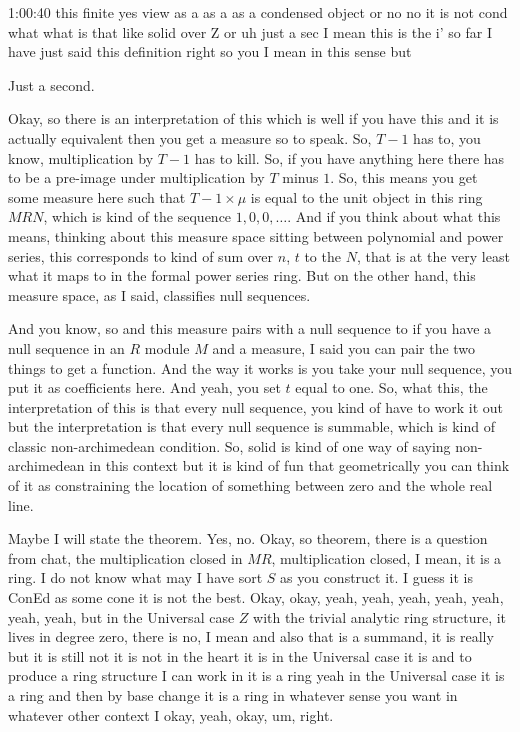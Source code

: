 \begin{unfinished}{1:00:40}
 this finite yes view as a as a as a condensed object or no no it is not cond what what is that like solid over Z or uh just a sec I mean this is the i' so far I have just said this definition right so you I mean in this sense but

Just a second.

Okay, so there is an interpretation of this which is well if you have this and it is actually equivalent then you get a measure so to speak. So, $T - 1$ has to, you know, multiplication by $T - 1$ has to kill. So, if you have anything here there has to be a pre-image under multiplication by $T$ minus $1$. So, this means you get some measure here such that $T - 1 \times \mu$ is equal to the unit object in this ring $MRN$, which is kind of the sequence $1, 0, 0, \ldots$. And if you think about what this means, thinking about this measure space sitting between polynomial and power series, this corresponds to kind of sum over $n$, $t$ to the $N$, that is  at the very least what it maps to in the formal power series ring. But on the other hand, this measure space, as I said, classifies null sequences.

And you know, so and this measure pairs with a null sequence to if you have a null sequence in an $R$ module $M$ and a measure, I said you can pair the two things to get a function. And the way it works is you take your null sequence, you put it as coefficients here. And yeah, you set $t$ equal to one. So, what this, the interpretation of this is that every null sequence, you kind of have to work it out but the interpretation is that every null sequence is summable, which is kind of classic non-archimedean condition. So, solid is kind of one way of saying non-archimedean in this context but it is kind of fun that geometrically you can think of it as constraining the location of something between zero and the whole real line.

Maybe I will state the theorem. Yes, no. Okay, so theorem, there is a question from chat, the multiplication closed in $MR$, multiplication closed, I mean, it is a ring. I do not know what may I have sort $S$ as you construct it. I guess it is ConEd as some cone it is not the best. Okay, okay, yeah, yeah, yeah, yeah, yeah, yeah, yeah, but in the Universal case $Z$ with the trivial analytic ring structure, it lives in degree zero, there is no, I mean and also that is  a summand, it is really but it is still not it is not in the heart it is in the Universal case it is and to produce a ring structure I can work in it is a ring yeah in the Universal case it is a ring and then by base change it is a ring in whatever sense you want in whatever other context I okay, yeah, okay, um, right. 


\end{unfinished}
